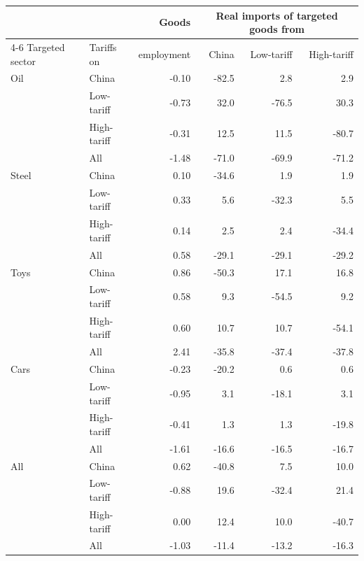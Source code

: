 \begin{tabular}{llrrrr}
\toprule
 & & Goods & \multicolumn{3}{c}{Real imports of targeted goods from} \\
\cmidrule(lr){4-6}
Targeted sector & Tariffs on & employment & China & Low-tariff & High-tariff \\
\midrule
Oil & China & -0.10 & -82.5 & 2.8 & 2.9 \\
 & Low-tariff & -0.73 & 32.0 & -76.5 & 30.3 \\
 & High-tariff & -0.31 & 12.5 & 11.5 & -80.7 \\
 & All & -1.48 & -71.0 & -69.9 & -71.2 \\
\midrule
Steel & China & 0.10 & -34.6 & 1.9 & 1.9 \\
 & Low-tariff & 0.33 & 5.6 & -32.3 & 5.5 \\
 & High-tariff & 0.14 & 2.5 & 2.4 & -34.4 \\
 & All & 0.58 & -29.1 & -29.1 & -29.2 \\
\midrule
Toys & China & 0.86 & -50.3 & 17.1 & 16.8 \\
 & Low-tariff & 0.58 & 9.3 & -54.5 & 9.2 \\
 & High-tariff & 0.60 & 10.7 & 10.7 & -54.1 \\
 & All & 2.41 & -35.8 & -37.4 & -37.8 \\
\midrule
Cars & China & -0.23 & -20.2 & 0.6 & 0.6 \\
 & Low-tariff & -0.95 & 3.1 & -18.1 & 3.1 \\
 & High-tariff & -0.41 & 1.3 & 1.3 & -19.8 \\
 & All & -1.61 & -16.6 & -16.5 & -16.7 \\
\midrule
All & China & 0.62 & -40.8 & 7.5 & 10.0 \\
 & Low-tariff & -0.88 & 19.6 & -32.4 & 21.4 \\
 & High-tariff & 0.00 & 12.4 & 10.0 & -40.7 \\
 & All & -1.03 & -11.4 & -13.2 & -16.3 \\
\bottomrule
\end{tabular}
